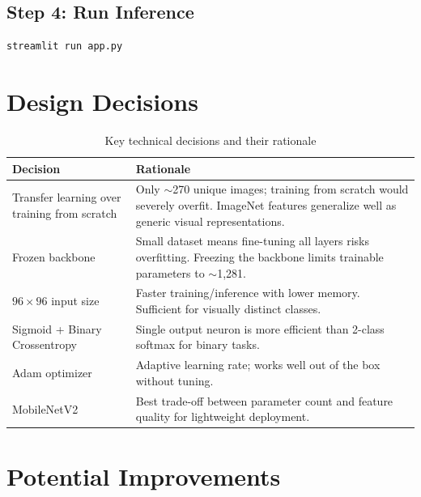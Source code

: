 \documentclass[12pt,a4paper]{article}
\begin{document}
\subsection{Step 4: Run Inference}

\begin{lstlisting}[language=bash]
streamlit run app.py
\end{lstlisting}

\section{Design Decisions}

\begin{table}[H]
    \centering
    \caption{Key technical decisions and their rationale}
    \begin{tabular}{@{}p{4cm}p{8cm}@{}}
        \toprule
        \textbf{Decision} & \textbf{Rationale} \\
        \midrule
        Transfer learning over training from scratch & Only $\sim$270 unique images; training from scratch would severely overfit. ImageNet features generalize well as generic visual representations. \\
        \addlinespace
        Frozen backbone & Small dataset means fine-tuning all layers risks overfitting. Freezing the backbone limits trainable parameters to $\sim$1,281. \\
        \addlinespace
        $96 \times 96$ input size & Faster training/inference with lower memory. Sufficient for visually distinct classes. \\
        \addlinespace
        Sigmoid + Binary Crossentropy & Single output neuron is more efficient than 2-class softmax for binary tasks. \\
        \addlinespace
        Adam optimizer & Adaptive learning rate; works well out of the box without tuning. \\
        \addlinespace
        MobileNetV2 & Best trade-off between parameter count and feature quality for lightweight deployment. \\
        \bottomrule
    \end{tabular}
\end{table}

\section{Potential Improvements}
\end{document}
